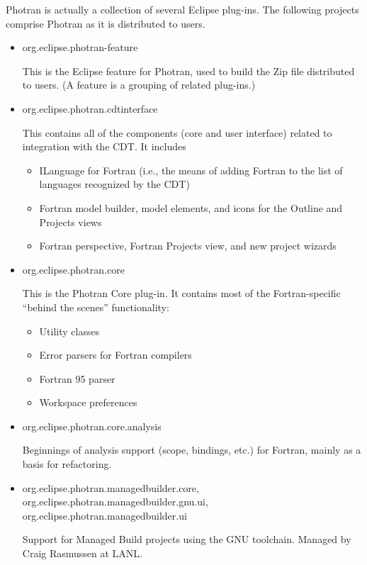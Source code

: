 
Photran is actually a collection of several Eclipse plug-ins.
The following projects comprise Photran as it is distributed to users.

\begin{itemize}

\item org.eclipse.photran-feature

	This is the Eclipse feature for Photran, used to build the Zip
	file distributed to users.  (A feature is a grouping of related
	plug-ins.)

\item org.eclipse.photran.cdtinterface

	This contains all of the components (core and user interface) related
	to integration with the CDT.  It includes
	\begin{itemize}
	\item ILanguage for Fortran (i.e., the means
              of adding Fortran to the list of languages recognized
              by the CDT)
	\item Fortran model builder, model elements, and icons for the Outline and Projects views
	\item Fortran perspective, Fortran Projects view, and new project wizards
	\end{itemize}

\item org.eclipse.photran.core

	This is the Photran Core plug-in.  It
	contains most of the Fortran-specific ``behind the scenes'' functionality:
	\begin{itemize}
	\item Utility classes
	\item Error parsers for Fortran compilers
	\item Fortran 95 parser
	\item Workspace preferences
	\end{itemize}

\item org.eclipse.photran.core.analysis

	Beginnings of analysis support (scope, bindings, etc.) for Fortran, mainly as a basis
	for refactoring.

\item org.eclipse.photran.managedbuilder.core,
      org.eclipse.photran.managedbuilder.gnu.ui,
      org.eclipse.photran.managedbuilder.ui

	Support for Managed Build projects using the GNU toolchain.
	Managed by Craig Rasmussen at LANL.


\end{itemize}
